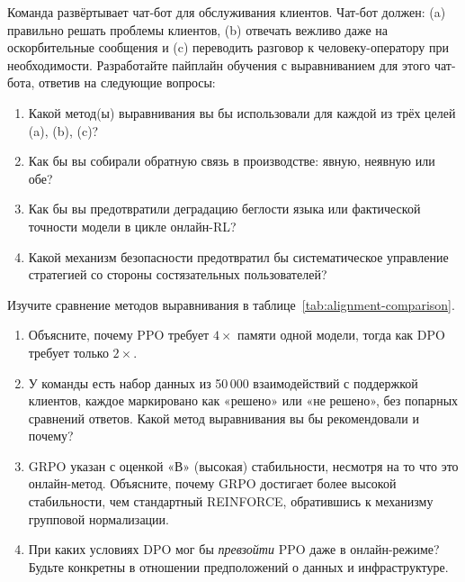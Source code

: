 \begin{exercise}
\label{ex:online-rl-design}
Команда развёртывает чат-бот для обслуживания клиентов. Чат-бот должен: (a) правильно решать проблемы клиентов, (b) отвечать вежливо даже на оскорбительные сообщения и (c) переводить разговор к человеку-оператору при необходимости. Разработайте пайплайн обучения с выравниванием для этого чат-бота, ответив на следующие вопросы:
\begin{enumerate}
  \item Какой метод(ы) выравнивания вы бы использовали для каждой из трёх целей (a), (b), (c)?
  \item Как бы вы собирали обратную связь в производстве: явную, неявную или обе?
  \item Как бы вы предотвратили деградацию беглости языка или фактической точности модели в цикле онлайн-RL?
  \item Какой механизм безопасности предотвратил бы систематическое управление стратегией со стороны состязательных пользователей?
\end{enumerate}
\end{exercise}

\begin{exercise}
\label{ex:comparison-table}
Изучите сравнение методов выравнивания в таблице~\ref{tab:alignment-comparison}.
\begin{enumerate}
  \item Объясните, почему PPO требует $4\times$ памяти одной модели, тогда как DPO требует только $2\times$.
  \item У команды есть набор данных из 50\,000 взаимодействий с поддержкой клиентов, каждое маркировано как «решено» или «не решено», без попарных сравнений ответов. Какой метод выравнивания вы бы рекомендовали и почему?
  \item GRPO указан с оценкой «В» (высокая) стабильности, несмотря на то что это онлайн-метод. Объясните, почему GRPO достигает более высокой стабильности, чем стандартный REINFORCE, обратившись к механизму групповой нормализации.
  \item При каких условиях DPO мог бы \emph{превзойти} PPO даже в онлайн-режиме? Будьте конкретны в отношении предположений о данных и инфраструктуре.
\end{enumerate}
\end{exercise}


